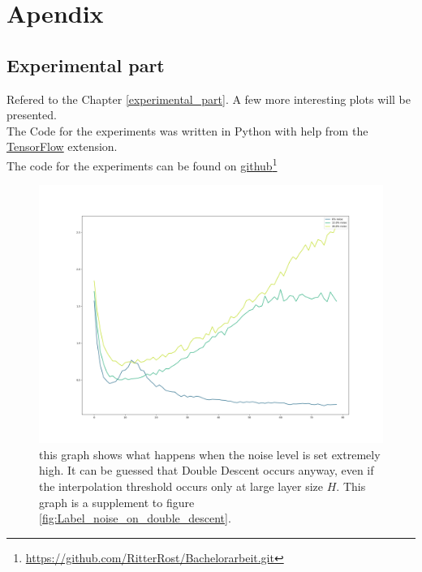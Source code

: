
\appendix

\chapter{Apendix}

\section{Experimental part }

Refered to the Chapter \ref{experimental_part}. A few more interesting plots will be presented.\\
The Code for the experiments was written in Python with help from the \hyperlink{https://www.tensorflow.org/resources/libraries-extensions}{TensorFlow} extension.\\
The code for the experiments can be found on \hyperlink{https://github.com/RitterRost/Bachelorarbeit.git}{github}\footnote{\url{https://github.com/RitterRost/Bachelorarbeit.git}}

\begin{figure}[!htp]
\centering
\includegraphics[width= 0.8\linewidth]{Abschlussarbeit_2021/LaTeX/images/noisy_curve.png}
\caption{this graph shows what happens when the noise level is set extremely high. It can be guessed that Double Descent occurs anyway, even if the interpolation threshold occurs only at large layer size $H$. This graph is a supplement to figure \ref{fig:Label_noise_on_double_descent}.}
\label{more_noise_can_hurt}
\end{figure}


